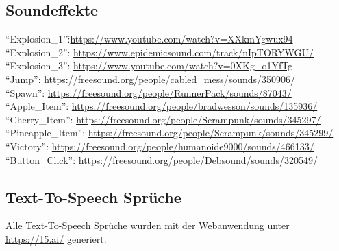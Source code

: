 \subsection{Soundeffekte}

\begin{tabbing}
\enquote{Explosion\_1}:\= \quad\quad\quad \url{https://www.youtube.com/watch?v=XXkmYgwux94}\\
\enquote{Explosion\_2}:\> \quad\quad\quad \url{https://www.epidemicsound.com/track/nIpTORYWGU/}\\
\enquote{Explosion\_3}:\> \quad\quad\quad \url{https://www.youtube.com/watch?v=0XKg_o1YfTg}\\
\enquote{Jump}:\> \quad\quad\quad \url{https://freesound.org/people/cabled_mess/sounds/350906/}\\
\enquote{Spawn}:\> \quad\quad\quad \url{https://freesound.org/people/RunnerPack/sounds/87043/}\\
\enquote{Apple\_Item}:\> \quad\quad\quad \url{https://freesound.org/people/bradwesson/sounds/135936/}\\
\enquote{Cherry\_Item}:\> \quad\quad\quad \url{https://freesound.org/people/Scrampunk/sounds/345297/}\\
\enquote{Pineapple\_Item}:\> \quad\quad\quad \url{https://freesound.org/people/Scrampunk/sounds/345299/}\\
\enquote{Victory}:\> \quad\quad\quad \url{https://freesound.org/people/humanoide9000/sounds/466133/}\\
\enquote{Button\_Click}:\> \quad\quad\quad \url{https://freesound.org/people/Debsound/sounds/320549/}
\end{tabbing}

\subsection{Text-To-Speech Sprüche}

Alle Text-To-Speech Sprüche wurden mit der Webanwendung unter \url{https://15.ai/} generiert.
